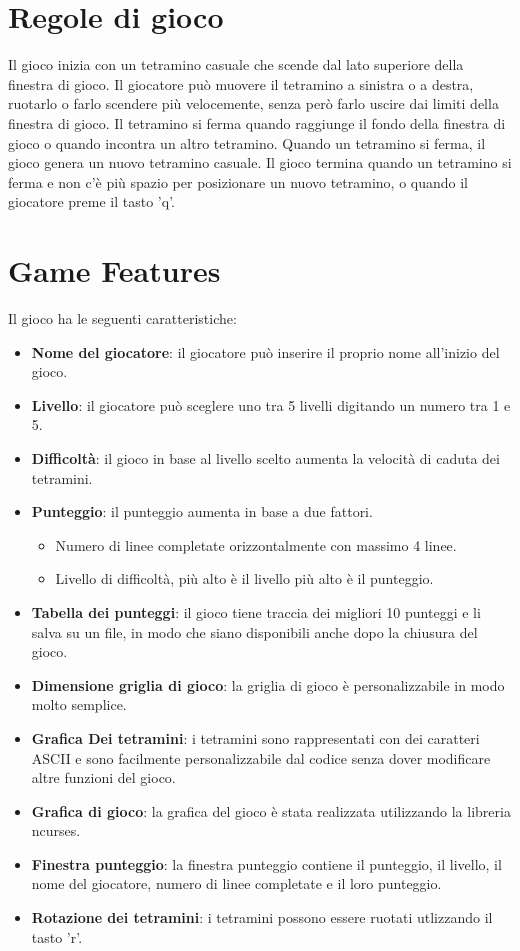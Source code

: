 \documentclass{article}
\begin{document}
\section{Regole di gioco}
Il gioco inizia con un tetramino casuale che scende dal lato superiore della finestra di gioco.
Il giocatore può muovere il tetramino a sinistra o a destra, ruotarlo o farlo scendere più velocemente, senza però farlo uscire dai limiti della finestra di gioco.
Il tetramino si ferma quando raggiunge il fondo della finestra di gioco o quando incontra un altro tetramino.
Quando un tetramino si ferma, il gioco genera un nuovo tetramino casuale.
Il gioco termina quando un tetramino si ferma e non c'è più spazio per posizionare un nuovo tetramino, o quando il giocatore preme il tasto 'q'.

\section{Game Features}
Il gioco ha le seguenti caratteristiche:
\begin{itemize}
\item \textbf{Nome del giocatore}: il giocatore può inserire il proprio nome all'inizio del gioco.
\item \textbf{Livello}: il giocatore può sceglere uno tra 5 livelli digitando un numero tra 1 e 5.
\item \textbf{Difficoltà}: il gioco in base al livello scelto aumenta la velocità di caduta dei tetramini.
\item \textbf{Punteggio}: il punteggio aumenta in base a due fattori.
\begin{itemize}
    \item Numero di linee completate orizzontalmente con massimo 4 linee.
    \item Livello di difficoltà, più alto è il livello più alto è il punteggio.
\end{itemize}
\item \textbf{Tabella dei punteggi}: il gioco tiene traccia dei migliori 10 punteggi e li salva su un file, in modo che siano disponibili anche dopo la chiusura del gioco.
\item \textbf{Dimensione griglia di gioco}: la griglia di gioco è personalizzabile in modo molto semplice.
\item \textbf{Grafica Dei tetramini}: i tetramini sono rappresentati con dei caratteri ASCII e sono facilmente personalizzabile dal codice senza dover modificare altre funzioni del gioco.
\item \textbf{Grafica di gioco}: la grafica del gioco è stata realizzata utilizzando la libreria ncurses.
\item \textbf{Finestra punteggio}: la finestra punteggio contiene il punteggio, il livello, il nome del giocatore, numero di linee completate e il loro punteggio.
\item \textbf{Rotazione dei tetramini}: i tetramini possono essere ruotati utlizzando il tasto 'r'.
\end{itemize}
\end{document}
